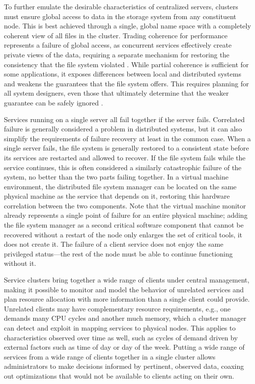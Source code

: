 To further emulate the desirable characteristics of centralized servers, clusters must ensure global access to data in the storage system from any constituent node. This is best achieved through a single, global name space with a completely coherent view of all files in the cluster. Trading coherence for performance represents a failure of global access, as concurrent services effectively create private views of the data, requiring a separate mechanism for restoring the consistency that the file system violated \cite{birrell93}. While partial coherence is sufficient for some applications, it exposes differences between local and distributed systems and weakens the guarantees that the file system offers. This requires planning for all system designers, even those that ultimately determine that the weaker guarantee can be safely ignored \cite{waldo}.

Services running on a single server all fail together if the server fails. Correlated failure is generally considered a problem in distributed systems, but it can also simplify the requirements of failure recovery at least in the common case. When a single server fails, the file system is generally restored to a consistent state before its services are restarted and allowed to recover. If the file system fails while the service continues, this is often considered a similarly catastrophic failure of the system, no better than the two parts failing together. In a virtual machine environment, the distributed file system manager can be located on the same physical machine as the service that depends on it, restoring this hardware correlation between the two components. Note that the virtual machine monitor already represents a single point of failure for an entire physical machine; adding the file system manager as a second critical software component that cannot be recovered without a restart of the node only enlarges the set of critical tools, it does not create it. The failure of a client service does not enjoy the same privileged status---the rest of the node must be able to continue functioning without it.

Service clusters bring together a wide range of clients under central management, making it possible to monitor and model the behavior of unrelated services and plan resource allocation with more information than a single client could provide. Unrelated clients may have complementary resource requirements, e.g., one demands many CPU cycles and another much memory, which a cluster manager can detect and exploit in mapping services to physical nodes. This applies to characteristics observed over time as well, such as cycles of demand driven by external factors such as time of day or day of the week. Putting a wide range of services from a wide range of clients together in a single cluster allows administrators to make decisions informed by pertinent, observed data, coaxing out optimizations that would not be available to clients acting on their own.

